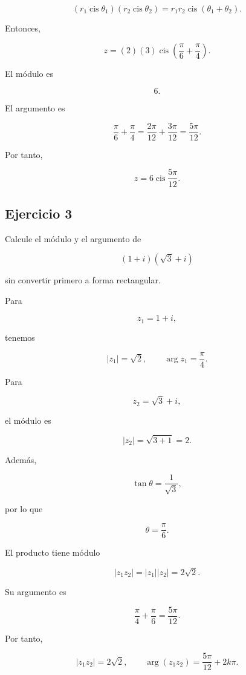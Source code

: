 \documentclass[12pt]{article}
\begin{document}
\[
(r_1\operatorname{cis}\theta_1)
(r_2\operatorname{cis}\theta_2)
=
r_1r_2\operatorname{cis}(\theta_1+\theta_2).
\]

Entonces,

\[
z
=
(2)(3)
\operatorname{cis}
\left(
\frac{\pi}{6}+\frac{\pi}{4}
\right).
\]

El módulo es

\[
6.
\]

El argumento es

\[
\frac{\pi}{6}+\frac{\pi}{4}
=
\frac{2\pi}{12}+\frac{3\pi}{12}
=
\frac{5\pi}{12}.
\]

Por tanto,

\[
\boxed{
z=
6\operatorname{cis}\frac{5\pi}{12}
}.
\]


\subsection*{Ejercicio 3}

Calcule el módulo y el argumento de

\[
(1+i)(\sqrt3+i)
\]

sin convertir primero a forma rectangular.

Para

\[
z_1=1+i,
\]

tenemos

\[
|z_1|=\sqrt2,
\qquad
\arg z_1=\frac{\pi}{4}.
\]

Para

\[
z_2=\sqrt3+i,
\]

el módulo es

\[
|z_2|
=
\sqrt{3+1}
=
2.
\]

Además,

\[
\tan\theta
=
\frac1{\sqrt3},
\]

por lo que

\[
\theta=\frac{\pi}{6}.
\]

El producto tiene módulo

\[
|z_1z_2|
=
|z_1||z_2|
=
2\sqrt2.
\]

Su argumento es

\[
\frac{\pi}{4}+\frac{\pi}{6}
=
\frac{5\pi}{12}.
\]

Por tanto,

\[
\boxed{
|z_1z_2|=2\sqrt2,
\qquad
\arg(z_1z_2)
=
\frac{5\pi}{12}+2k\pi
}.
\]

\end{document}
